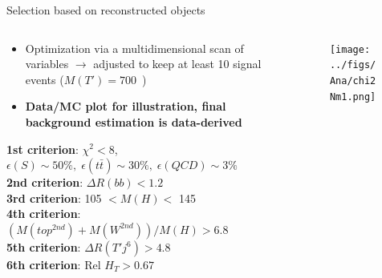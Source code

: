 \begin{frame}{Selection based on reconstructed objects}
\vspace{-.2cm}
\scriptsize

\begin{columns}
\begin{column}{.50\textwidth}
\vspace{-.2cm}
\begin{block}{}
\tiny
\begin{itemize}
\item Optimization via a multidimensional scan of variables $\to$ adjusted to keep at least 10 signal events ($M(T')=700$~\GeVcc)
\item \textbf{Data/MC plot for illustration, final background estimation is data-derived}
\end{itemize}
\end{block}
\vspace{-.2cm}
\begin{block}{}\scriptsize
\textbf{1st criterion}: $\chi^{2}<8$, \tiny{${\epsilon(S)\sim 50\%,\; \epsilon(t\bar{t})\sim 30\%,\; \epsilon(QCD)\sim 3\%}$}\\
\scriptsize{
\textbf{2nd criterion}: $\Delta R(bb)<1.2$\\
\textbf{3rd criterion}: 105 $<M(H)<$ 145 \GeVcc\\
\textbf{4th criterion}: $(M(top^{2nd})+M(W^{2nd}))/M(H)>6.8$\\
\textbf{5th criterion}: $\Delta R (T' j^{6})>4.8$\\
\textbf{6th criterion}: Rel $H_{T}>0.67$}
\end{block}
\end{column}

\begin{column}{.50\textwidth}
\begin{figure}[!Hhtbp]
  \begin{center}
    \texttt{[image: ../figs/Ana/chi2Nm1.png]}
  \end{center}
\end{figure}
\end{column}

\end{columns}

\end{frame}



